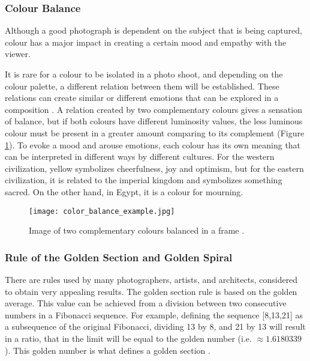 \subsubsection{Colour Balance}
\label{subsub:colour_balance}

Although a good photograph is dependent on the subject that is being captured, colour has a major impact in creating a certain mood and empathy with the viewer. 

It is rare for a colour to be isolated in a photo shoot, and depending on the colour palette, a different relation between them will be established. These relations can create similar or different emotions that can be explored in a composition \cite{Santos}.
A relation created by two complementary colours gives a sensation of balance, but if both colours have different luminosity values, the less luminous colour must be present in a greater amount comparing to its complement (Figure \ref{fig:colour_balance_image}).
To evoke a mood and arouse emotions, each colour has its own meaning that can be interpreted in different ways by different cultures. For the western civilization, yellow symbolizes cheerfulness, joy and optimism, but for the eastern civilization, it is related to the imperial kingdom and symbolizes something sacred. On the other hand, in Egypt, it is a colour for mourning.

\begin{figure}[htbp]
    \centering
	\label{fig:colour_balance_example}
    \texttt{[image: color\_balance\_example.jpg]}
  \caption{Image of two complementary colours balanced in a frame \cite{Santos}.}
  \label{fig:colour_balance_image}
\end{figure}

\subsubsection{Rule of the Golden Section and Golden Spiral}
\label{subsub:golden_section}

There are rules used by many photographers, artists, and architects, considered to obtain very appealing results. The golden section rule is based on the golden average. This value can be achieved from a division between two consecutive numbers in a Fibonacci sequence. For example, defining the sequence [8,13,21] as a subsequence of the original Fibonacci, dividing 13 by 8, and 21 by 13 will result in a ratio, that in the limit will be equal to the golden number (i.e. $\approx 1.6180339$). This golden number is what defines a golden section \cite{Santos}. 

